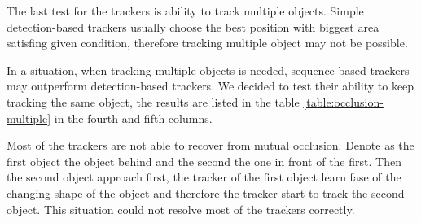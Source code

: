 The last test for the trackers is ability to track multiple objects. Simple
detection-based trackers usually choose the best position with biggest area
satisfing given condition, therefore tracking multiple object may not be
possible.

In a situation, when tracking multiple objects is needed, sequence-based
trackers may outperform detection-based trackers. We decided to test their
ability to keep tracking the same object, the results are listed in the table
\ref{table:occlusion-multiple} in the fourth and fifth columns.


Most of the trackers are not able to recover from mutual occlusion. Denote as
the first object the object behind and the second the one in front of the
first. Then the second object approach first, the tracker of the first object
learn fase of the changing shape of the object and therefore the tracker start
to track the second object. This situation could not resolve most of the
trackers correctly.

